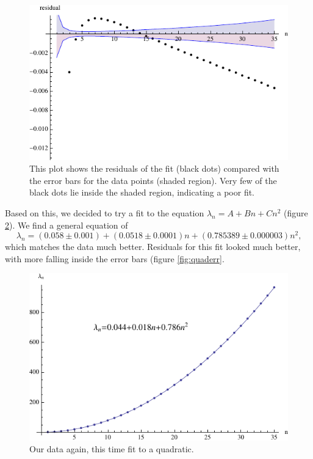 \documentclass[12pt,twoside]{reedthesis}
\newcommand{\eqn}[1]{\begin{equation}#1\end{equation}}
\begin{document}
\begin{figure}[h]
\centering
\includegraphics{Figures/logerr}
\caption[Residuals of log-log fit]{This plot shows the residuals of the fit (black dots) compared with the error bars for the data points (shaded region). Very few of the black dots lie inside the shaded region, indicating a poor fit.}
\label{fig:logerr}
\end{figure}
Based on this, we decided to try a fit to the equation $\lambda_n = A + B n + C n^2$ (figure \ref{fig:quadfit}). We find a general equation of 
\eqn{
\lambda_n = (0.058 \pm 0.001) + (0.0518 \pm 0.0001) n + ( 0.785389 \pm 0.000003) n^2\mbox{,}
}
which matches the data much better. Residuals for this fit looked much better, with more falling inside the error bars (figure \ref{fig:quaderr}.
\begin{figure}[h]
\centering
\includegraphics{Figures/quadfit}
\caption[Quadratic fit]{Our data again, this time fit to a quadratic.}
\label{fig:quadfit}
\end{figure}
\end{document}
